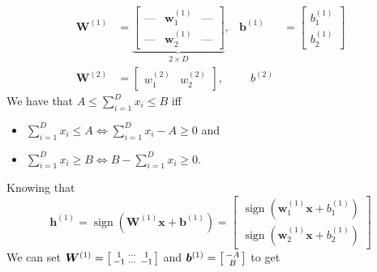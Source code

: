 \documentclass[11pt]{article}
\DeclareMathOperator{\sign}{sign}
\begin{document}
\begin{align*}
  \bm{W}^{(1)} &= \underbrace{\begin{bmatrix}
                   \text{---} &\bm{w}^{(1)}_{1}  &\text{---} \\
                   \text{---} &\bm{w}^{(1)}_{2} &\text{---}
                 \end{bmatrix}}_{2 \times D}, &\bm{b}^{(1)} &= \begin{bmatrix}
                                                  b^{(1)}_{1} \\
                                                  b^{(1)}_{2}
                                                 \end{bmatrix} \\
  \bm{W}^{(2)} &= \begin{bmatrix}
                   w^{(2)}_{1} & w^{(2)}_{2}
                 \end{bmatrix}, &\quad b^{(2)} &
\end{align*}
We have that $A \leq \sum_{i = 1}^{D} x_{i} \leq B$ iff
\begin{itemize}
\item $\sum_{i = 1}^{D} x_{i} \leq A \iff \sum_{i = 1}^{D} x_{i} - A \geq 0$ and
\item $\sum_{i = 1}^{D} x_{i} \geq B \iff B - \sum_{i = 1}^{D} x_{i} \geq 0$.
\end{itemize}
Knowing that
\begin{equation*}
  \bm{h}^{(1)} = \sign \left( \bm{W}^{(1)} \bm{x} + \bm{b}^{(1)} \right) = \begin{bmatrix}
                                                                             \sign \left( \bm{w}^{(1)}_{1} \bm{x} + b^{(1)}_{1} \right) \\
                                                                             \sign \left( \bm{w}^{(1)}_{2} \bm{x} + b^{(1)}_{2} \right)
                                                                           \end{bmatrix}
                                                                         \end{equation*}
We can set $\bm{W}^{(1)} = \begin{bsmallmatrix} 1 &\cdots &1 \\
                       -1 &\cdots &-1 \end{bsmallmatrix}$ and $\bm{b}^{(1)} = \begin{bsmallmatrix}
                                                                          - A \\
                                                                          B                                                                       \end{bsmallmatrix}$ to get
\end{document}
